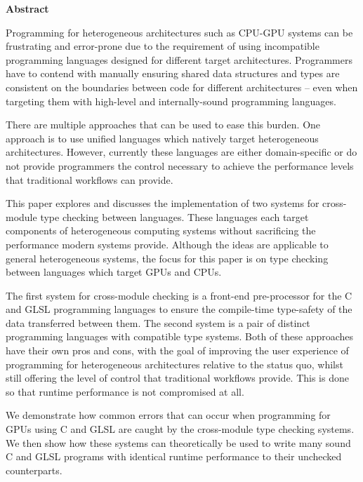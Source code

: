 \newpage
{\Huge \bf Abstract}
\vspace{24pt}






Programming for heterogeneous architectures such as CPU-GPU systems can be
frustrating and error-prone due to the requirement of using incompatible
programming languages designed for different target architectures. Programmers
have to contend with manually ensuring shared data structures and types are
consistent on the boundaries between code for different architectures -- even
when targeting them with high-level and internally-sound programming languages.

There are multiple approaches that can be used to ease this burden. One
approach is to use unified languages which natively target heterogeneous
architectures. However, currently these languages are either domain-specific or
do not provide programmers the control necessary to achieve the performance
levels that traditional workflows can provide.

This paper explores and discusses the implementation of two systems for
cross-module type checking between languages. These languages each target
components of heterogeneous computing systems without sacrificing the
performance modern systems provide. Although the ideas are applicable to
general heterogeneous systems, the focus for this paper is on type checking
between languages which target GPUs and CPUs.

The first system for cross-module checking is a front-end pre-processor for the
C and GLSL programming languages to ensure the compile-time type-safety of the
data transferred between them. The second system is a pair of distinct
programming languages with compatible type systems. Both of these approaches
have their own pros and cons, with the goal of improving the user experience of
programming for heterogeneous architectures relative to the status quo, whilst
still offering the level of control that traditional workflows provide. This is
done so that runtime performance is not compromised at all.

We demonstrate how common errors that can occur when programming for GPUs using
C and GLSL are caught by the cross-module type checking systems. We then show
how these systems can theoretically be used to write many sound C and GLSL
programs with identical runtime performance to their unchecked counterparts.

\newpage
\vspace*{\fill}
